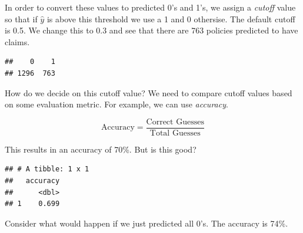 \documentclass[
  openany]{book}
\newenvironment{Shaded}{\begin{snugshade}}{\end{snugshade}}
\newcommand{\DataTypeTok}[1]{\textcolor[rgb]{0.13,0.29,0.53}{#1}}
\newcommand{\DecValTok}[1]{\textcolor[rgb]{0.00,0.00,0.81}{#1}}
\newcommand{\KeywordTok}[1]{\textcolor[rgb]{0.13,0.29,0.53}{\textbf{#1}}}
\newcommand{\NormalTok}[1]{#1}
\newcommand{\OperatorTok}[1]{\textcolor[rgb]{0.81,0.36,0.00}{\textbf{#1}}}
\newcommand{\StringTok}[1]{\textcolor[rgb]{0.31,0.60,0.02}{#1}}
\begin{document}
In order to convert these values to predicted 0's and 1's, we assign a \emph{cutoff} value so that if \(\hat{y}\) is above this threshold we use a 1 and 0 othersise. The default cutoff is 0.5. We change this to 0.3 and see that there are 763 policies predicted to have claims.

\begin{Shaded}
\end{Shaded}

\begin{verbatim}
##    0    1 
## 1296  763
\end{verbatim}

How do we decide on this cutoff value? We need to compare cutoff values based on some evaluation metric. For example, we can use \emph{accuracy}.

\[\text{Accuracy} = \frac{\text{Correct Guesses}}{\text{Total Guesses}}\]

This results in an accuracy of 70\%. But is this good?

\begin{Shaded}
\end{Shaded}

\begin{verbatim}
## # A tibble: 1 x 1
##   accuracy
##      <dbl>
## 1    0.699
\end{verbatim}

Consider what would happen if we just predicted all 0's. The accuracy is 74\%.

\begin{Shaded}
\end{Shaded}
\end{document}
